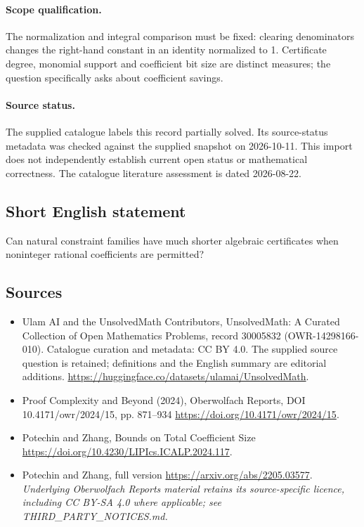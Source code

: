 \documentclass[11pt]{article}
\begin{document}
\paragraph{Scope qualification.}
The normalization and integral comparison must be fixed: clearing denominators changes the right-hand constant in an identity normalized to 1. Certificate degree, monomial support and coefficient bit size are distinct measures; the question specifically asks about coefficient savings.
\paragraph{Source status.}
The supplied catalogue labels this record partially solved. Its source-status metadata was checked against the supplied snapshot on 2026-10-11. This import does not independently establish current open status or mathematical correctness. The catalogue literature assessment is dated 2026-08-22.
\subsection{Short English statement}
Can natural constraint families have much shorter algebraic certificates when noninteger rational coefficients are permitted?
\subsection{Sources}
\begin{itemize}
\item[S1] Ulam AI and the UnsolvedMath Contributors, UnsolvedMath: A Curated Collection of Open Mathematics Problems, record 30005832 (OWR-14298166-010). Catalogue curation and metadata: CC BY 4.0. The supplied source question is retained; definitions and the English summary are editorial additions.
\url{https://huggingface.co/datasets/ulamai/UnsolvedMath}.
\item[S2] Proof Complexity and Beyond (2024), Oberwolfach Reports, DOI 10.4171/owr/2024/15, pp. 871--934
\url{https://doi.org/10.4171/owr/2024/15}.
\item[S3] Potechin and Zhang, Bounds on Total Coefficient Size
\url{https://doi.org/10.4230/LIPIcs.ICALP.2024.117}.
\item[S4] Potechin and Zhang, full version
\url{https://arxiv.org/abs/2205.03577}.
\textit{Underlying Oberwolfach Reports material retains its source-specific licence, including CC BY-SA 4.0 where applicable; see THIRD\_PARTY\_NOTICES.md.}
\end{itemize}
\end{document}
